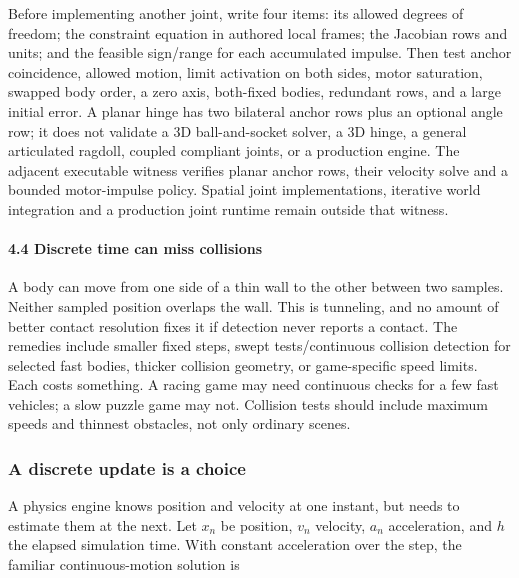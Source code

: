 Before implementing another joint, write four items: its allowed degrees of freedom; the constraint equation in authored local frames; the Jacobian rows and units; and the feasible sign/range for each accumulated impulse. Then test anchor coincidence, allowed motion, limit activation on both sides, motor saturation, swapped body order, a zero axis, both-fixed bodies, redundant rows, and a large initial error. A planar hinge has two bilateral anchor rows plus an optional angle row; it does not validate a 3D ball-and-socket solver, a 3D hinge, a general articulated ragdoll, coupled compliant joints, or a production engine. The adjacent executable witness verifies planar anchor rows, their velocity solve and a bounded motor-impulse policy. Spatial joint implementations, iterative world integration and a production joint runtime remain outside that witness.

\paragraph{4.4 Discrete time can miss collisions}\label{06-engine-ii-ch033-discrete-time-can-miss-collisions}

\hypertarget{06-engine-ii-ch033-discrete-time-can-miss-collisions}{}

A body can move from one side of a thin wall to the other between two samples. Neither sampled position overlaps the wall. This is tunneling, and no amount of better contact resolution fixes it if detection never reports a contact. The remedies include smaller fixed steps, swept tests/continuous collision detection for selected fast bodies, thicker collision geometry, or game-specific speed limits. Each costs something. A racing game may need continuous checks for a few fast vehicles; a slow puzzle game may not. Collision tests should include maximum speeds and thinnest obstacles, not only ordinary scenes.

\subsubsection{A discrete update is a choice}\label{06-engine-ii-ch033-a-discrete-update-is-a-choice}

\hypertarget{06-engine-ii-ch033-a-discrete-update-is-a-choice}{}

A physics engine knows position and velocity at one instant, but needs to estimate them at the next. Let \(x_n\) be position, \(v_n\) velocity, \(a_n\) acceleration, and \(h\) the elapsed simulation time. With constant acceleration over the step, the familiar continuous-motion solution is

